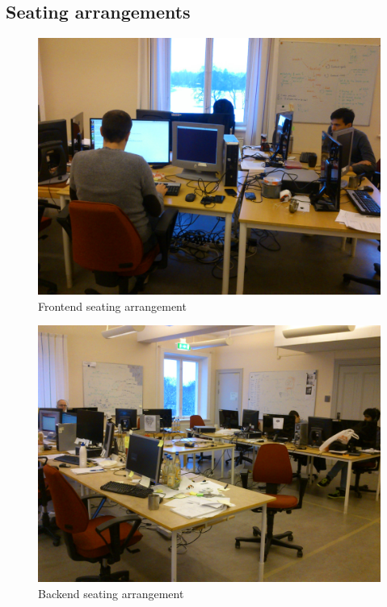 \subsection{Seating arrangements}
\begin{figure}
\centering
\includegraphics[scale=0.1]{graphics/frontend_seating}
\caption{Frontend seating arrangement}\label{fig:frontend_seating}
\end{figure}


\begin{figure}
\centering
\includegraphics[scale=0.1]{graphics/backend_seating}
\caption{Backend seating arrangement}\label{fig:backend_seating}
\end{figure}
